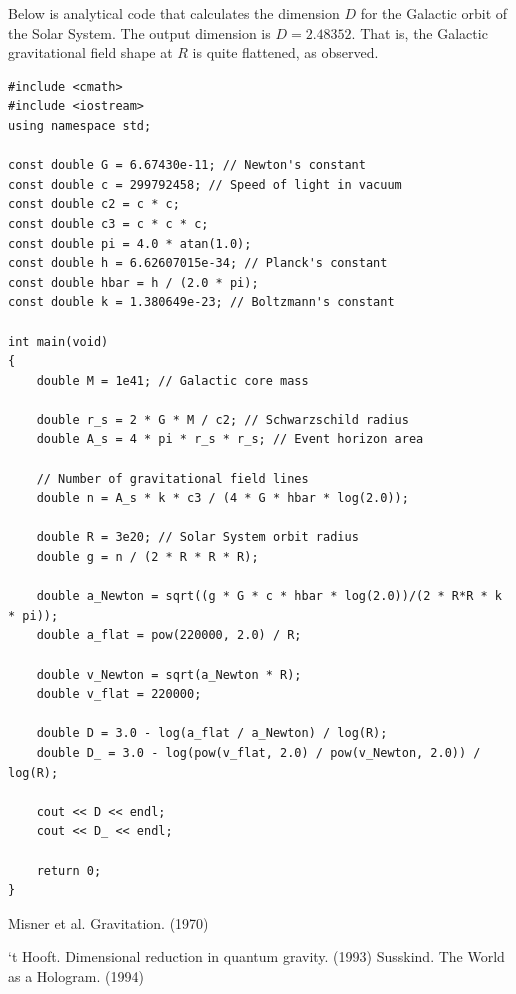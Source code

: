 \documentclass[12pt]{article}
\begin{document}
Below is analytical code that calculates the dimension $D$ for the Galactic orbit of the Solar System.
The output dimension is $D = 2.48352$.
That is, the Galactic gravitational field shape at $R$ is quite flattened, as observed.
\begin{lstlisting}
#include <cmath>
#include <iostream>
using namespace std;

const double G = 6.67430e-11; // Newton's constant
const double c = 299792458; // Speed of light in vacuum
const double c2 = c * c;
const double c3 = c * c * c;
const double pi = 4.0 * atan(1.0);
const double h = 6.62607015e-34; // Planck's constant
const double hbar = h / (2.0 * pi);
const double k = 1.380649e-23; // Boltzmann's constant

int main(void)
{
	double M = 1e41; // Galactic core mass

	double r_s = 2 * G * M / c2; // Schwarzschild radius
	double A_s = 4 * pi * r_s * r_s; // Event horizon area

	// Number of gravitational field lines
	double n = A_s * k * c3 / (4 * G * hbar * log(2.0)); 

	double R = 3e20; // Solar System orbit radius
	double g = n / (2 * R * R * R);

	double a_Newton = sqrt((g * G * c * hbar * log(2.0))/(2 * R*R * k * pi));
	double a_flat = pow(220000, 2.0) / R;

	double v_Newton = sqrt(a_Newton * R);
	double v_flat = 220000;

	double D = 3.0 - log(a_flat / a_Newton) / log(R);
	double D_ = 3.0 - log(pow(v_flat, 2.0) / pow(v_Newton, 2.0)) / log(R);

	cout << D << endl;
	cout << D_ << endl;

	return 0;
}
\end{lstlisting}













\begin{thebibliography}{9}

 Misner et al. Gravitation. (1970)

 `t Hooft. Dimensional reduction in quantum gravity. (1993)
 Susskind. The World as a Hologram. (1994)








\end{thebibliography}
\end{document}
